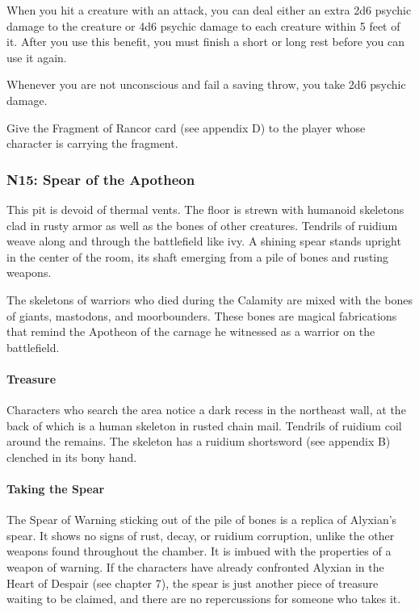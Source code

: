 \documentclass[10pt,a4paper,twoside,bg=print,twocolumn,openany,nodeprecatedcode]{dndbook}
\begin{document}
\begin{DndComment}{}

\begin{description}[nolistsep]
\item[Benefit.]
When you hit a creature with an attack, you can deal either an extra 2d6 psychic damage to the creature or 4d6 psychic damage to each creature within 5 feet of it. After you use this benefit, you must finish a short or long rest before you can use it again.
\item[Drawback.]
Whenever you are not unconscious and fail a saving throw, you take 2d6 psychic damage.
\end{description}


\end{DndComment}

Give the Fragment of Rancor card (see appendix D) to the player whose character is carrying the fragment.



\subsubsection{N15: Spear of the Apotheon}
\begin{DndReadAloud}{}
This pit is devoid of thermal vents. The floor is strewn with humanoid skeletons clad in rusty armor as well as the bones of other creatures. Tendrils of ruidium weave along and through the battlefield like ivy. A shining spear stands upright in the center of the room, its shaft emerging from a pile of bones and rusting weapons.

\end{DndReadAloud}

The skeletons of warriors who died during the Calamity are mixed with the bones of giants, mastodons, and moorbounders. These bones are magical fabrications that remind the Apotheon of the carnage he witnessed as a warrior on the battlefield.

\paragraph{Treasure}
Characters who search the area notice a dark recess in the northeast wall, at the back of which is a human skeleton in rusted chain mail. Tendrils of ruidium coil around the remains. The skeleton has a ruidium shortsword (see appendix B) clenched in its bony hand.

\paragraph{Taking the Spear}
The Spear of Warning sticking out of the pile of bones is a replica of Alyxian's spear. It shows no signs of rust, decay, or ruidium corruption, unlike the other weapons found throughout the chamber. It is imbued with the properties of a weapon of warning. If the characters have already confronted Alyxian in the Heart of Despair (see chapter 7), the spear is just another piece of treasure waiting to be claimed, and there are no repercussions for someone who takes it.
\end{document}
